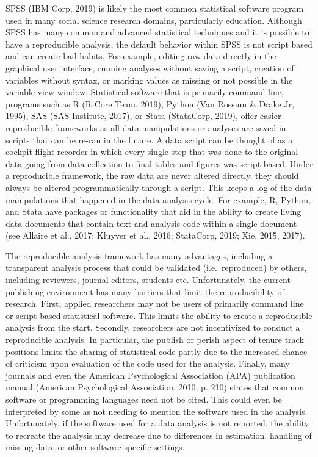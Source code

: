 \documentclass[
  english,
  ,man]{apa6}
\begin{document}
SPSS (IBM Corp, 2019) is likely the most common statistical software program used in many social science research domains, particularly education. Although SPSS has many common and advanced statistical techniques and it is possible to have a reproducible analysis, the default behavior within SPSS is not script based and can create bad habits. For example, editing raw data directly in the graphical user interface, running analyses without saving a script, creation of variables without syntax, or marking values as missing or not possible in the variable view window. Statistical software that is primarily command line, programs such as R (R Core Team, 2019), Python (Van Rossum \& Drake Jr, 1995), SAS (SAS Institute, 2017), or Stata (StataCorp, 2019), offer easier reproducible frameworks as all data manipulations or analyses are saved in scripts that can be re-ran in the future. A data script can be thought of as a cockpit flight recorder in which every single step that was done to the original data going from data collection to final tables and figures was script based. Under a reproducible framework, the raw data are never altered directly, they should always be altered programmatically through a script. This keeps a log of the data manipulations that happened in the data analysis cycle. For example, R, Python, and Stata have packages or functionality that aid in the ability to create living data documents that contain text and analysis code within a single document (see Allaire et al., 2017; Kluyver et al., 2016; StataCorp, 2019; Xie, 2015, 2017).

The reproducible analysis framework has many advantages, including a transparent analysis process that could be validated (i.e.~reproduced) by others, including reviewers, journal editors, students etc. Unfortunately, the current publishing environment has many barriers that limit the reproducibility of research. First, applied researchers may not be users of primarily command line or script based statistical software. This limits the ability to create a reproducible analysis from the start. Secondly, researchers are not incentivized to conduct a reproducible analysis. In particular, the publish or perish aspect of tenure track positions limits the sharing of statistical code partly due to the increased chance of criticism upon evaluation of the code used for the analysis. Finally, many journals and even the American Psychological Association (APA) publication manual (American Psychological Association, 2010, p. 210) states that common software or programming languages need not be cited. This could even be interpreted by some as not needing to mention the software used in the analysis. Unfortunately, if the software used for a data analysis is not reported, the ability to recreate the analysis may decrease due to differences in estimation, handling of missing data, or other software specific settings.
\end{document}
